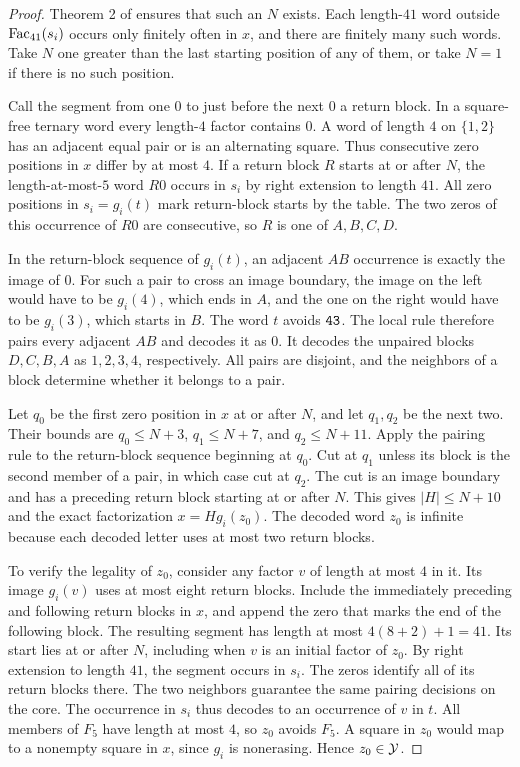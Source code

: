 \begin{proof}
Theorem 2 of \cite{BO} ensures that such an \(N\) exists. Each
length-\(41\) word outside \(\operatorname{Fac}_{41}(s_i)\) occurs only finitely
often in \(x\), and there are finitely many such words. Take \(N\)
one greater than the last starting position of any of them, or
take \(N=1\) if there is no such position.

Call the segment from one \(0\) to just before the next \(0\) a return
block. In a square-free ternary word every length-\(4\) factor contains
\(0\). A word of length \(4\) on \(\{1,2\}\) has an adjacent equal
pair or is an alternating square. Thus consecutive zero positions
in \(x\) differ by at most \(4\). If a return block \(R\) starts at
or after \(N\), the length-at-most-\(5\) word \(R0\) occurs in
\(s_i\) by right extension to length \(41\). All zero positions in
\(s_i=g_i(t)\) mark return-block starts by the table. The two zeros
of this occurrence of \(R0\) are consecutive, so \(R\) is one of
\(A,B,C,D\).

In the return-block sequence of \(g_i(t)\), an adjacent \(AB\)
occurrence is exactly the image of \(0\). For such a pair to cross
an image boundary, the image on the left would have to be \(g_i(4)\),
which ends in \(A\), and the one on the right would have to be
\(g_i(3)\), which starts in \(B\). The word \(t\) avoids \(\mathtt{43}\).
The local rule therefore pairs every adjacent \(AB\) and decodes it
as \(0\). It decodes the unpaired blocks \(D,C,B,A\) as \(1,2,3,4\),
respectively. All pairs are disjoint, and the neighbors of a block
determine whether it belongs to a pair.

Let \(q_0\) be the first zero position in \(x\) at or after \(N\), and
let \(q_1,q_2\) be the next two. Their bounds are \(q_0\le N+3\),
\(q_1\le N+7\), and \(q_2\le N+11\). Apply the pairing rule to the
return-block sequence beginning at \(q_0\). Cut at \(q_1\) unless
its block is the second member of a pair, in which case cut at
\(q_2\). The cut is an image boundary and has a preceding return
block starting at or after \(N\). This gives \(|H|\le N+10\)
and the exact factorization \(x=H g_i(z_0)\). The decoded word
\(z_0\) is infinite because each decoded letter uses at most two
return blocks.

To verify the legality of \(z_0\), consider any factor \(v\) of
length at most \(4\) in it. Its image \(g_i(v)\) uses at most eight
return blocks. Include the immediately preceding and following
return blocks in \(x\), and append the zero that marks the end
of the following block. The resulting segment has length at most
\(4(8+2)+1=41\). Its start lies at or after \(N\), including when
\(v\) is an initial factor of \(z_0\). By right extension to
length \(41\), the segment occurs in \(s_i\). The zeros identify
all of its return blocks there. The two neighbors guarantee the
same pairing decisions on the core. The occurrence in \(s_i\)
thus decodes to an occurrence of \(v\) in \(t\). All members of
\(F_5\) have length at most \(4\), so \(z_0\) avoids \(F_5\).
A square in \(z_0\) would map to a nonempty square in \(x\),
since \(g_i\) is nonerasing. Hence \(z_0\in\mathcal Y\).
\end{proof}

